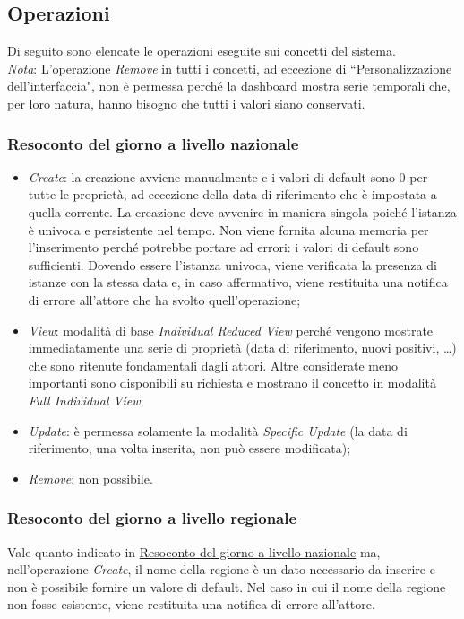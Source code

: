 \subsection{Operazioni}
\label{ss:operazioni}
Di seguito sono elencate le operazioni eseguite sui concetti del sistema.\\
\noindent
\textit{Nota}: L'operazione \textit{Remove} in tutti i concetti, ad eccezione di ``Personalizzazione dell'interfaccia", non è permessa perché la dashboard mostra serie temporali che, per loro natura, hanno bisogno che tutti i valori siano conservati.

\subsubsection{Resoconto del giorno a livello nazionale}
\label{sss:operazioni-resoconto-del-giorno-livello-nazionale}
\begin{itemize}
    \item \textit{Create}: la creazione avviene manualmente e i valori di default sono 0 per tutte le proprietà, ad eccezione della data di riferimento che è impostata a quella corrente.
    La creazione deve avvenire in maniera singola poiché l'istanza è univoca e persistente nel tempo.
    Non viene fornita alcuna memoria per l'inserimento perché potrebbe portare ad errori: i valori di default sono sufficienti.
    Dovendo essere l'istanza univoca, viene verificata la presenza di istanze con la stessa data e, in caso affermativo, viene restituita una notifica di errore all'attore che ha svolto quell'operazione;
    \item \textit{View}: modalità di base \textit{Individual Reduced View} perché vengono mostrate immediatamente una serie di proprietà (data di riferimento, nuovi positivi, \dots) che sono ritenute fondamentali dagli attori.
    Altre considerate meno importanti sono disponibili su richiesta e mostrano il concetto in modalità \textit{Full Individual View};
    \item \textit{Update}: è permessa solamente la modalità \textit{Specific Update} (la data di riferimento, una volta inserita, non può essere modificata);
    \item \textit{Remove}: non possibile.
\end{itemize}

\subsubsection{Resoconto del giorno a livello regionale}
\label{sss:operazioni-resoconto-del-giorno-livello-regionale}
Vale quanto indicato in \hyperref[sss:operazioni-resoconto-del-giorno-livello-nazionale]{Resoconto del giorno a livello nazionale} ma, nell'operazione \textit{Create}, il nome della regione è un dato necessario da inserire e non è possibile fornire un valore di default.
Nel caso in cui il nome della regione non fosse esistente, viene restituita una notifica di errore all'attore.


